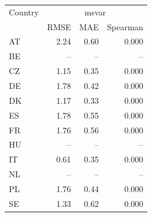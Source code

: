 \begin{tabular}{lrrr}
\toprule
Country & \multicolumn{3}{c}{msvar} \\
 & RMSE & MAE & Spearman \\
\midrule
AT & 2.24 & 0.60 & 0.000 \\
BE & -- & -- & -- \\
CZ & 1.15 & 0.35 & 0.000 \\
DE & 1.78 & 0.42 & 0.000 \\
DK & 1.17 & 0.33 & 0.000 \\
ES & 1.78 & 0.55 & 0.000 \\
FR & 1.76 & 0.56 & 0.000 \\
HU & -- & -- & -- \\
IT & 0.61 & 0.35 & 0.000 \\
NL & -- & -- & -- \\
PL & 1.76 & 0.44 & 0.000 \\
SE & 1.33 & 0.62 & 0.000 \\
\bottomrule
\end{tabular}